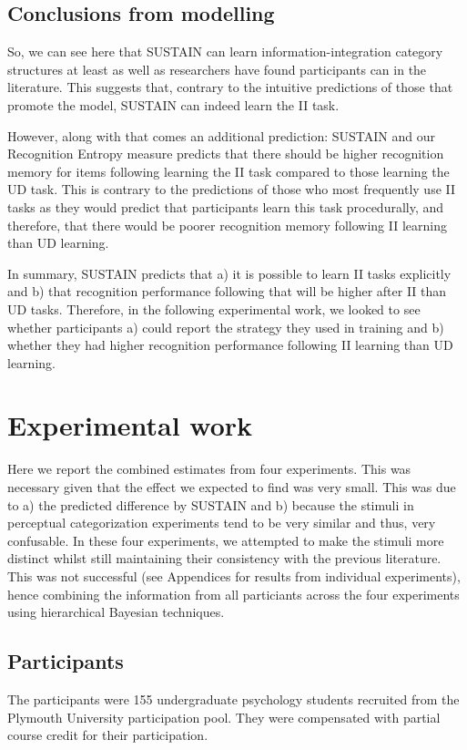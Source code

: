 \documentclass[12pt]{article}
\begin{document}
\subsection{Conclusions from modelling}
So, we can see here that SUSTAIN can learn information-integration category structures at least as well as researchers have found participants can in the literature. This suggests that, contrary to the intuitive predictions of those that promote the model, SUSTAIN can indeed learn the II task. 

However, along with that comes an additional prediction: SUSTAIN and our Recognition Entropy measure predicts that there should be higher recognition memory for items following learning the II task compared to those learning the UD task. This is contrary to the predictions of those who most frequently use II tasks as they would predict that participants learn this task procedurally, and therefore, that there would be poorer recognition memory following II learning than UD learning.

In summary, SUSTAIN predicts that a) it is possible to learn II tasks explicitly and b) that recognition performance following that will be higher after II than UD tasks. Therefore, in the following experimental work, we looked to see whether participants a) could report the strategy they used in training and b) whether they had higher recognition performance following II learning than UD learning. 

\section{Experimental work}
Here we report the combined estimates from four experiments. This was necessary given that the effect we expected to find was very small. This was due to a) the predicted difference by SUSTAIN and b) because the stimuli in perceptual categorization experiments tend to be very similar and thus, very confusable. In these four experiments, we attempted to make the stimuli more distinct whilst still maintaining their consistency with the previous literature. This was not successful (see Appendices for results from individual experiments), hence combining the information from all particiants across the four experiments using hierarchical Bayesian techniques. 

\subsection{Participants}
The participants were 155 undergraduate psychology students recruited from the Plymouth University participation pool. They were compensated with partial course credit for their participation.
\end{document}
